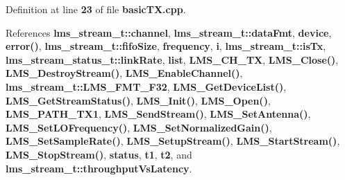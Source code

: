 Definition at line {\bf 23} of file {\bf basic\+T\+X.\+cpp}.



References {\bf lms\+\_\+stream\+\_\+t\+::channel}, {\bf lms\+\_\+stream\+\_\+t\+::data\+Fmt}, {\bf device}, {\bf error()}, {\bf lms\+\_\+stream\+\_\+t\+::fifo\+Size}, {\bf frequency}, {\bf i}, {\bf lms\+\_\+stream\+\_\+t\+::is\+Tx}, {\bf lms\+\_\+stream\+\_\+status\+\_\+t\+::link\+Rate}, {\bf list}, {\bf L\+M\+S\+\_\+\+C\+H\+\_\+\+TX}, {\bf L\+M\+S\+\_\+\+Close()}, {\bf L\+M\+S\+\_\+\+Destroy\+Stream()}, {\bf L\+M\+S\+\_\+\+Enable\+Channel()}, {\bf lms\+\_\+stream\+\_\+t\+::\+L\+M\+S\+\_\+\+F\+M\+T\+\_\+\+F32}, {\bf L\+M\+S\+\_\+\+Get\+Device\+List()}, {\bf L\+M\+S\+\_\+\+Get\+Stream\+Status()}, {\bf L\+M\+S\+\_\+\+Init()}, {\bf L\+M\+S\+\_\+\+Open()}, {\bf L\+M\+S\+\_\+\+P\+A\+T\+H\+\_\+\+T\+X1}, {\bf L\+M\+S\+\_\+\+Send\+Stream()}, {\bf L\+M\+S\+\_\+\+Set\+Antenna()}, {\bf L\+M\+S\+\_\+\+Set\+L\+O\+Frequency()}, {\bf L\+M\+S\+\_\+\+Set\+Normalized\+Gain()}, {\bf L\+M\+S\+\_\+\+Set\+Sample\+Rate()}, {\bf L\+M\+S\+\_\+\+Setup\+Stream()}, {\bf L\+M\+S\+\_\+\+Start\+Stream()}, {\bf L\+M\+S\+\_\+\+Stop\+Stream()}, {\bf status}, {\bf t1}, {\bf t2}, and {\bf lms\+\_\+stream\+\_\+t\+::throughput\+Vs\+Latency}.



